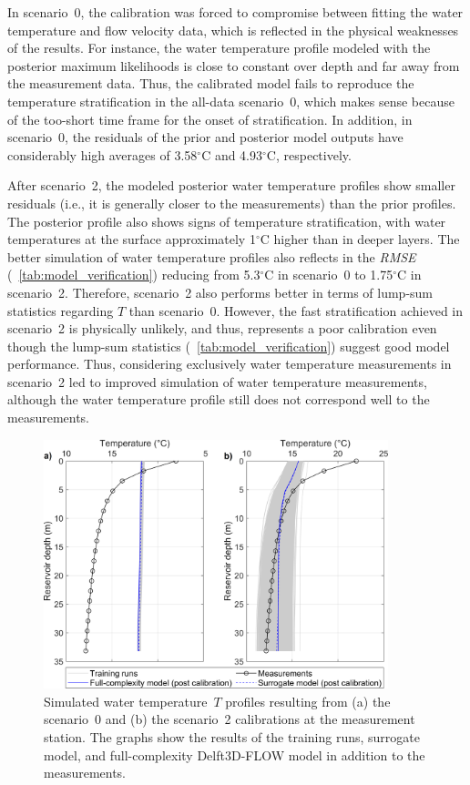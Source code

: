 \documentclass[draft,linenumbers,onecolumn]{agujournal2019} %
\begin{document}
In scenario~0, the calibration was forced to compromise between fitting the water temperature and flow velocity data, which is reflected in the physical weaknesses of the results. For instance, the water temperature profile modeled with the posterior maximum likelihoods is close to constant over depth and far away from the measurement data. Thus, the calibrated model fails to reproduce the temperature stratification in the all-data scenario~0, which makes sense because of the too-short time frame for the onset of stratification. In addition, in scenario~0, the residuals of the prior and posterior model outputs have considerably high averages of 3.58\(^{\circ}\)C and 4.93\(^{\circ}\)C, respectively.

After scenario~2, the modeled posterior water temperature profiles show smaller residuals (i.e., it is generally closer to the measurements) than the prior profiles. The posterior profile also shows signs of temperature stratification, with water temperatures at the surface approximately 1$^{\circ}$C higher than in deeper layers. The better simulation of water temperature profiles also reflects in the \textit{RMSE} (\tablename{~\ref{tab:model_verification}}) reducing from 5.3$^{\circ}$C in scenario~0 to 1.75\(^{\circ}\)C in scenario~2. Therefore, scenario~2 also performs better in terms of lump-sum statistics regarding $T$ than scenario~0. However, the fast stratification achieved in scenario~2 is physically unlikely, and thus, represents a poor calibration even though the lump-sum statistics (\tablename{~\ref{tab:model_verification}}) suggest good model performance. Thus, considering exclusively water temperature measurements in scenario~2 led to improved simulation of water temperature measurements, although the water temperature profile still does not correspond well to the measurements.

\begin{figure}
	\centering
	\includegraphics[width=10cm]{post-T-xscenario.png} %
	\caption{Simulated water temperature~$T$ profiles resulting from (a) the scenario~0 and (b) the scenario~2 calibrations at the measurement station. The graphs show the results of the training runs, surrogate model, and full-complexity Delft3D-FLOW model in addition to the measurements.}
	\label{fig06:postT}
\end{figure}
\end{document}
